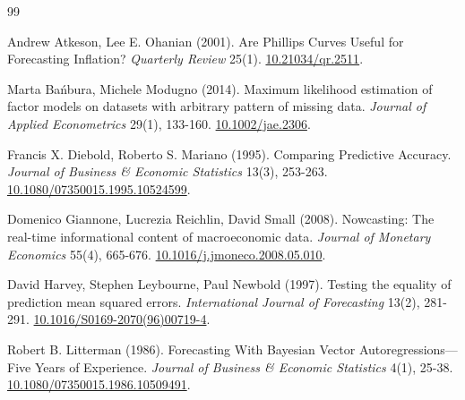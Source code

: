 \begin{thebibliography}{99}

 Andrew Atkeson, Lee E. Ohanian (2001). Are Phillips Curves Useful for Forecasting Inflation? \textit{Quarterly Review} 25(1). \href{https://doi.org/10.21034/qr.2511}{10.21034/qr.2511}.

 Marta Bańbura, Michele Modugno (2014). Maximum likelihood estimation of factor models on datasets with arbitrary pattern of missing data. \textit{Journal of Applied Econometrics} 29(1), 133-160. \href{https://doi.org/10.1002/jae.2306}{10.1002/jae.2306}.

 Francis X. Diebold, Roberto S. Mariano (1995). Comparing Predictive Accuracy. \textit{Journal of Business \& Economic Statistics} 13(3), 253-263. \href{https://doi.org/10.1080/07350015.1995.10524599}{10.1080/07350015.1995.10524599}.

 Domenico Giannone, Lucrezia Reichlin, David Small (2008). Nowcasting: The real-time informational content of macroeconomic data. \textit{Journal of Monetary Economics} 55(4), 665-676. \href{https://doi.org/10.1016/j.jmoneco.2008.05.010}{10.1016/j.jmoneco.2008.05.010}.

 David Harvey, Stephen Leybourne, Paul Newbold (1997). Testing the equality of prediction mean squared errors. \textit{International Journal of Forecasting} 13(2), 281-291. \href{https://doi.org/10.1016/S0169-2070(96)00719-4}{10.1016/S0169-2070(96)00719-4}.

 Robert B. Litterman (1986). Forecasting With Bayesian Vector Autoregressions—Five Years of Experience. \textit{Journal of Business \& Economic Statistics} 4(1), 25-38. \href{https://doi.org/10.1080/07350015.1986.10509491}{10.1080/07350015.1986.10509491}.

\end{thebibliography}
